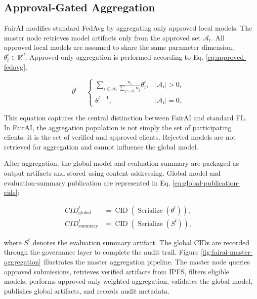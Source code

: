 \documentclass[futureinternet,article,submit,pdftex,moreauthors]{Definitions/mdpi}
\begin{document}
\subsection{Approval-Gated Aggregation}
\label{subsec:approval-gated-aggregation}

FairAI modifies standard FedAvg by aggregating only approved local models. The master node retrieves model artifacts only from the approved set \(\mathcal{A}_t\). All approved local models are assumed to share the same parameter dimension, \(\theta_i^t \in \mathbb{R}^{d}\). Approved-only aggregation is performed according to Eq. \eqref{eq:approved-fedavg}.

\begin{equation}
	\label{eq:approved-fedavg}
	\theta^t =
	\begin{cases}
		\displaystyle
		\sum_{i \in \mathcal{A}_t}
		\frac{n_i}{\sum_{j \in \mathcal{A}_t} n_j}
		\theta_i^t,
		&
		|\mathcal{A}_t| > 0, \\[2.2ex]
		\theta^{t-1},
		&
		|\mathcal{A}_t| = 0.
	\end{cases}
\end{equation}

This equation captures the central distinction between FairAI and standard FL. In FairAI, the aggregation population is not simply the set of participating clients; it is the set of verified and approved clients. Rejected models are not retrieved for aggregation and cannot influence the global model.

After aggregation, the global model and evaluation summary are packaged as output artifacts and stored using content addressing. Global model and evaluation-summary publication are represented in Eq. \eqref{eq:global-publication-cids}:

\begin{subequations}
	\label{eq:global-publication-cids}
	\begin{align}
		CID_{\mathrm{global}}^t
		&=
		\operatorname{CID}
		\left(
		\operatorname{Serialize}(\theta^t)
		\right),
		\label{eq:global-model-cid}
		\\
		CID_{\mathrm{summary}}^t
		&=
		\operatorname{CID}
		\left(
		\operatorname{Serialize}(S^t)
		\right),
		\label{eq:evaluation-summary-cid}
	\end{align}
\end{subequations}

where \(S^t\) denotes the evaluation summary artifact. The global CIDs are recorded through the governance layer to complete the audit trail. Figure \ref{fig:fairai-master-aggregation} illustrates the master aggregation pipeline. The master node queries approved submissions, retrieves verified artifacts from IPFS, filters eligible models, performs approved-only weighted aggregation, validates the global model, publishes global artifacts, and records audit metadata.
\end{document}
